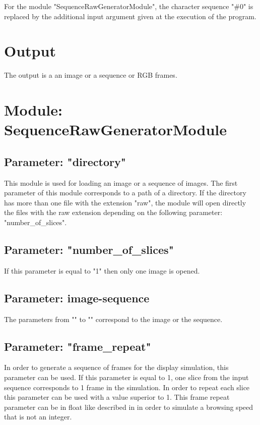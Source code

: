 For the module "SequenceRawGeneratorModule", the character sequence "$\#0$" is replaced by the additional input argument given at the execution of the program. 

\section{Output}

The output is a an image or a sequence or RGB frames.

\section{Module: SequenceRawGeneratorModule}

\subsection{Parameter: "directory"}

This module is used for loading an image or a sequence of images. The first parameter of this module corresponds to a path of a directory. If the directory has more than one file with the extension "raw", the module will open directly the files with the raw extension depending on the following parameter: "number\_of\_slices".

\subsection{Parameter: "number\_of\_slices"}

If this parameter is equal to "1" then only one image is opened.

\subsection{Parameter: image-sequence}

The parameters from "" to "" correspond to the image or the sequence.

\subsection{Parameter: "frame\_repeat"}

In order to generate a sequence of frames for the display simulation, this parameter can be used. If this parameter is equal to 1, one slice from the input sequence corresponds to 1 frame in the simulation. In order to repeat each slice this parameter can be used with a value superior to 1. This frame repeat parameter can be in float like described in \cite{Mar12} in order to simulate a browsing speed that is not an integer.

